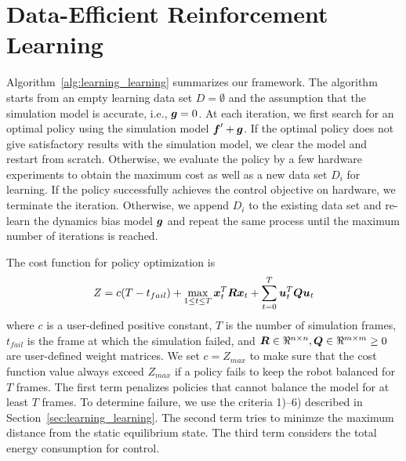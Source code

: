 \section{Data-Efficient Reinforcement Learning} \label{sec:learning_policy-optim}


Algorithm~\ref{alg:learning_learning} summarizes our framework.
The algorithm starts from an empty learning data set $D=\emptyset$ and
the assumption that the simulation model is accurate, i.e.,
$\mbox{\boldmath \(g\)}=0$.
At each iteration, we first search for an optimal policy using
the simulation model $\mbox{\boldmath \(f\)}' + \mbox{\boldmath \(g\)}$.
If the optimal policy does not give satisfactory results with the
simulation model, we clear the model and restart from scratch.
Otherwise, we evaluate the policy by a few hardware experiments to
obtain the maximum cost as well as a new data set $D_i$ for learning.
If the policy successfully achieves the control objective on hardware,
we terminate the iteration.
Otherwise, we append $D_i$ to the existing data set and re-learn the
dynamics bias model $\mbox{\boldmath \(g\)}$ and repeat the same process until the
maximum number of iterations is reached.

The cost function for policy optimization is
\begin{equation}
Z = c (T-t_{fail}) + \max_{1\leq t \leq T} \mbox{\boldmath \(x\)}_t^T \mbox{\boldmath \(R\)}
 \mbox{\boldmath \(x\)}_t +
\sum_{t=0}^T \mbox{\boldmath \(u\)}_t^T \mbox{\boldmath \(Q\)} \mbox{\boldmath \(u\)}_t
\end{equation}
where $c$ is a user-defined positive constant, $T$ is the number of
simulation frames, $t_{fail}$ is the frame at which the simulation failed, and
$\mbox{\boldmath \(R\)}\in\Re^{n\times n},\mbox{\boldmath \(Q\)}\in\Re^{m\times m}\geq 0$ are
user-defined weight matrices. 
We set $c = Z_{max}$ to make sure that the cost function value always
exceed $Z_{max}$ if a policy fails to keep the robot balanced for $T$
frames. 
The first term penalizes policies that cannot balance the model for at
least $T$ frames. 
To determine failure, we use the criteria 1)--6) described in
Section~\ref{sec:learning_learning}.
The second term tries to minimze the maximum distance from the
static equilibrium state.
The third term considers the total energy consumption for control.


